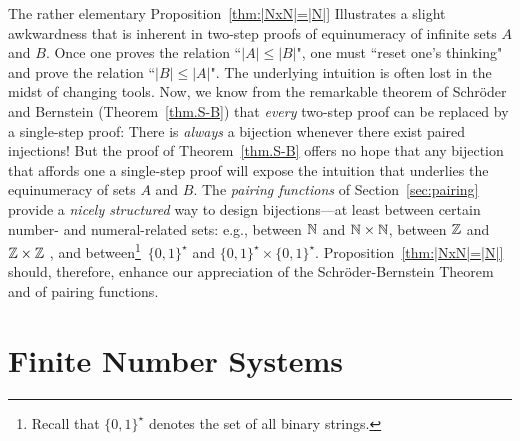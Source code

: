 The rather elementary Proposition~\ref{thm:|NxN|=|N|} Illustrates a slight awkwardness that is inherent in two-step proofs of equinumeracy of infinite sets $A$ and $B$.  Once one proves the relation ``$|A| \leq |B|$", one must ``reset one's thinking" and prove the relation ``$|B|\leq |A|$".  The underlying intuition is often lost in the midst of changing tools.  Now, we know from the remarkable theorem of Schr\"{o}der and Bernstein (Theorem~\ref{thm.S-B}) that {\em every} two-step proof can be replaced by a single-step proof: There is {\em always} a bijection whenever there exist paired injections!  But the proof of Theorem~\ref{thm.S-B} offers no hope that any bijection that affords one a single-step proof will expose the intuition that underlies the 
equinumeracy of sets $A$ and $B$.  The {\it pairing functions} of Section~\ref{sec:pairing} provide a {\em nicely structured} way to design bijections---at least between certain number- and numeral-related sets: e.g., between $\mathbb{N}$ and $\mathbb{N} \times \mathbb{N}$, between $\mathbb{Z}$ and $\mathbb{Z} \times \mathbb{Z}$ , and between\footnote{Recall that $\{0,1\}^\star$ denotes the set of all binary strings.}~$\{0,1\}^\star$ and $\{0,1\}^\star \times \{0,1\}^\star$.  Proposition~\ref{thm:|NxN|=|N|} should, therefore, enhance our appreciation of the Schr\"{o}der-Bernstein Theorem and of pairing functions.


\section{Finite Number Systems}
\label{sec:congruences+modular}

 
